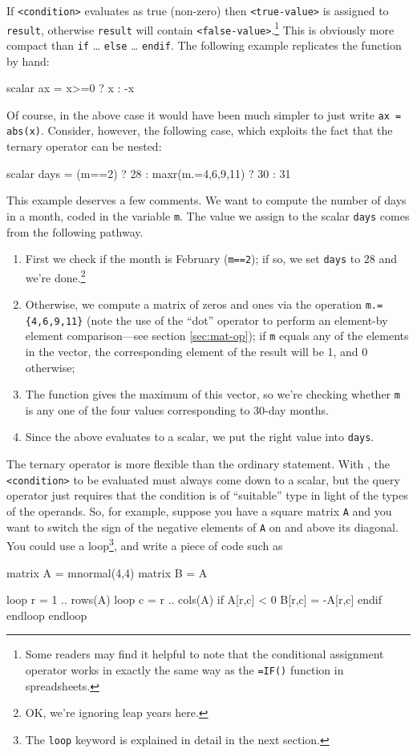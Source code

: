 If \texttt{<condition>} evaluates as true (non-zero) then
\texttt{<true-value>} is assigned to \texttt{result}, otherwise
\texttt{result} will contain \texttt{<false-value>}.\footnote{Some
  readers may find it helpful to note that the conditional assignment
  operator works in exactly the same way as the \texttt{=IF()} function
  in spreadsheets.}  This is obviously more compact than \texttt{if}
\dots{} \texttt{else} \dots{} \texttt{endif}. The following example
replicates the  function by hand:
\begin{code}
scalar ax = x>=0 ? x : -x
\end{code}
Of course, in the above case it would have been much simpler to just
write \texttt{ax = abs(x)}. Consider, however, the following case,
which exploits the fact that the ternary operator can be nested:
\begin{code}
scalar days = (m==2) ? 28 : maxr(m.={4,6,9,11}) ? 30 : 31
\end{code}
This example deserves a few comments. We want to compute the number of
days in a month, coded in the variable \texttt{m}. The value we assign
to the scalar \texttt{days} comes from the following pathway.
\begin{enumerate}
\item First we check if the month is February (\texttt{m==2}); if so,
  we set \texttt{days} to 28 and we're done.\footnote{OK, we're ignoring
    leap years here.}
\item Otherwise, we compute a matrix of zeros and ones via the
  operation \verb|m.={4,6,9,11}| (note the use of the ``dot'' operator
  to perform an element-by element comparison---see section
  \ref{sec:mat-op}); if \texttt{m} equals any of the elements in the
  vector, the corresponding element of the result will be 1, and 0
  otherwise;
\item The  function gives the maximum of this vector, so
  we're checking whether \texttt{m} is any one of the four values
  corresponding to 30-day months.
\item Since the above evaluates to a scalar, we put the right value
  into \texttt{days}.
\end{enumerate}

The ternary operator is more flexible than the ordinary 
statement. With , the \texttt{<condition>} to be evaluated
must always come down to a scalar, but the query operator just
requires that the condition is of ``suitable'' type in light of the
types of the operands.  So, for example, suppose you have a square
matrix \texttt{A} and you want to switch the sign of the negative
elements of \texttt{A} on and above its diagonal. You could use a
loop\footnote{The \texttt{loop} keyword is explained in detail in the
  next section.}, and write a piece of code such as
\begin{code}
matrix A = mnormal(4,4)
matrix B = A

loop r = 1 .. rows(A)
  loop c = r .. cols(A)
     if A[r,c] < 0
       B[r,c] = -A[r,c]
     endif
  endloop
endloop
\end{code}

